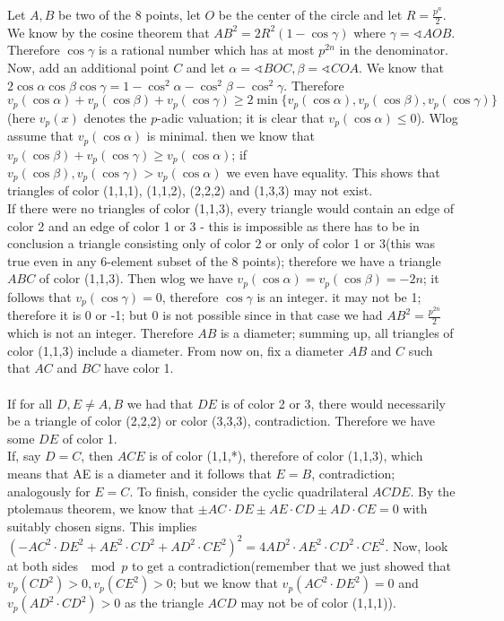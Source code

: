 Let $A,B$ be two of the 8 points, let $O$ be the center of the circle and let $R=\frac{p^n}2$. We know by the cosine theorem that $AB^2=2R^2(1-\cos \gamma)$ where $\gamma=\sphericalangle AOB$. Therefore $\cos \gamma$ is a rational number which has at most $p^{2n}$ in the denominator. Now, add an additional point $C$ and let $\alpha=\sphericalangle BOC, \beta=\sphericalangle COA$. We know that $2\cos \alpha \cos \beta \cos \gamma=1-\cos ^2 \alpha - \cos ^2 \beta - \cos ^2 \gamma$. Therefore $v_p(\cos \alpha) + v_p(\cos \beta) + v_p(\cos \gamma) \geq 2\min \{ v_p(\cos \alpha), v_p(\cos \beta), v_p(\cos \gamma) \}$ (here $v_p(x)$ denotes the $p$-adic valuation; it is clear that $v_p(\cos \alpha) \leq 0$). Wlog assume that $v_p(\cos \alpha)$ is minimal. then we know that $v_p(\cos \beta) + v_p(\cos \gamma)\geq v_p(\cos \alpha)$; if $v_p(\cos \beta),v_p(\cos \gamma) > v_p(\cos \alpha)$ we even have equality. This shows that triangles of color (1,1,1), (1,1,2), (2,2,2) and (1,3,3) may not exist. \\
If there were no triangles of color (1,1,3), every triangle would contain an edge of color 2 and an edge of color 1 or 3 - this is impossible as there has to be in conclusion a triangle consisting only of color 2 or only of color 1 or 3(this was true even in any 6-element subset of the 8 points); therefore we have a triangle $ABC$ of color (1,1,3). Then wlog we have $v_p(\cos \alpha)=v_p(\cos \beta)=-2n$; it follows that $v_p(\cos \gamma)=0$, therefore $\cos \gamma$ is an integer. it may not be 1; therefore it is 0 or -1; but 0 is not possible since in that case we had $AB^2=\frac{p^{2n}}2$ which is not an integer. Therefore $AB$ is a diameter; summing up, all triangles of color (1,1,3) include a diameter. From now on, fix a diameter $AB$ and $C$ such that $AC$ and $BC$ have color 1. \\\\
If for all $D,E\neq A,B$ we had that $DE$ is of color 2 or 3, there would necessarily be a triangle of color (2,2,2) or color (3,3,3), contradiction. Therefore we have some $DE$ of color 1. \\
If, say $D=C$, then $ACE$ is of color (1,1,*), therefore of color (1,1,3), which means that AE is a diameter and it follows that $E=B$, contradiction; analogously for $E=C$. To finish, consider the cyclic quadrilateral $ACDE$. By the ptolemaus theorem, we know that $\pm AC\cdot DE \pm AE\cdot CD \pm AD\cdot CE=0$ with suitably chosen signs. This implies $(- AC^2\cdot DE^2 + AE^2\cdot CD^2 + AD^2\cdot CE^2)^2=4AD^2\cdot AE^2\cdot CD^2\cdot CE^2$. Now, look at both sides $\mod p$ to get a contradiction(remember that we just showed that $v_p(CD^2)>0, v_p(CE^2)>0$; but we know that $v_p(AC^2\cdot DE^2)=0$ and $v_p(AD^2\cdot CD^2)>0$ as the triangle $ACD$ may not be of color (1,1,1)). \\\\
